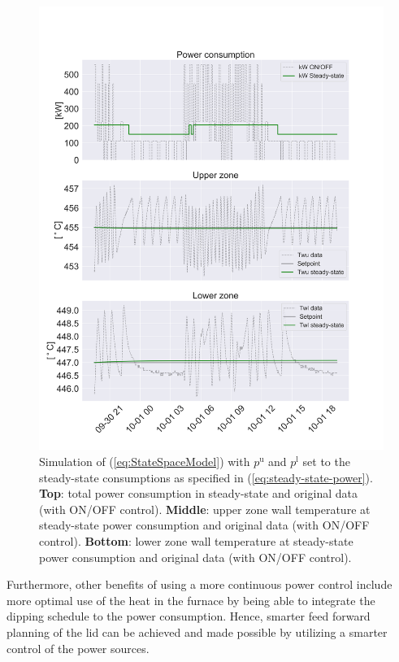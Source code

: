 \documentclass[lettersize,journal]{IEEEtran}
\begin{document}
\begin{figure}[!t]
    \centering
    \includegraphics[width=\columnwidth]{figures/4thOrderModelVisualizationSteadyState.png}
    \caption{Simulation of (\ref{eq:StateSpaceModel}) with $p^{\text{u}}$ and $p^{\text{l}}$ set to the steady-state consumptions as specified in (\ref{eq:steady-state-power}). \textbf{Top}: total power consumption in steady-state and original data (with ON/OFF control). \textbf{Middle}: upper zone wall temperature at steady-state power consumption and original data (with ON/OFF control). \textbf{Bottom}: lower zone wall temperature at steady-state power consumption and original data (with ON/OFF control).}
    \label{fig:4thOrderModelVisualizationSteadyState}
\end{figure}

Furthermore, other benefits of using a more continuous power control include more optimal use of the heat in the furnace by being able to integrate the dipping schedule to the power consumption. Hence, smarter feed forward planning of the lid can be achieved and made possible by utilizing a smarter control of the power sources.
\end{document}
